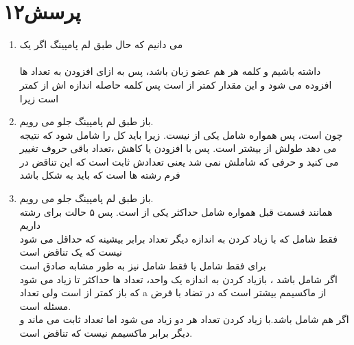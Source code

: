 \documentclass[a4paper]{article}
\begin{document}
\section*{پرسش۱۲}
\begin{enumerate}

\item{}
می دانیم که 
حال طبق لم پامپینگ اگر یک\\
\\
داشته باشیم و کلمه
 هر
هم عضو زبان باشد، پس به ازای افزودن 
به تعداد
ها افزوده می شود و این مقدار کمتر از
است پس کلمه حاصله اندازه اش از 
کمتر است زیرا

\item{}
باز طبق لم پامپینگ جلو می رویم.
\\
چون
است، پس  
همواره شامل یکی از 
نیست.
زیرا باید کل 
را شامل شود که نتیجه می دهد طولش از 
بیشتر است.
پس با افزودن یا کاهش
،تعداد باقی حروف تغییر می کنید و حرفی که شاملش نمی شد یعنی
تعدادش ثابت است که این تناقض در فرم رشته ها است که باید به شکل
باشد

\item{}
باز طبق لم پامپینگ جلو می رویم.
\\
همانند قسمت قبل همواره شامل حداکثر یکی از 
است.
پس ۵ حالت برای رشته 
 داریم\\
فقط شامل
که با زیاد کردن 
به اندازه
دیگر تعداد
برابر بیشینه 
که حداقل می شود
نیست که یک تناقض است\\
برای فقط شامل 
یا فقط شامل
نیز به طور مشابه صادق است\\
اگر شامل 
باشد ، بازیاد کردن
 به اندازه یک واحد، تعداد
 ها حداکثر
 تا زیاد می شود که باز کمتر از
 است ولی تعداد a
 از ماکسیمم بیشتر است که در تضاد با فرض مسئله است.
\\
اگر هم شامل
باشد.با زیاد کردن
تعداد 
هر دو زیاد می شود اما تعداد
ثابت می ماند و دیگر برابر ماکسیمم نیست که تناقض است.




\end{enumerate}

\pagebreak
\end{document}
